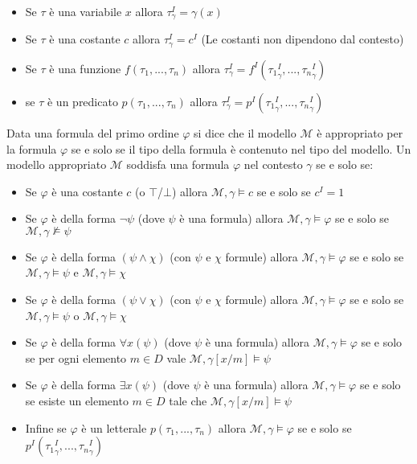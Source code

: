 \documentclass[./main.tex]{subfiles}
\begin{document}
\begin{itemize}
  \item Se $\tau$ è una variabile $x$ allora $\tau^I_\gamma = \gamma(x)$
  \item Se $\tau$ è una costante $c$ allora $\tau^I_\gamma = c^I$ (Le costanti non dipendono dal contesto)
  \item Se $\tau$ è una funzione $f(\tau_1, ..., \tau_n)$ allora $\tau^I_\gamma = f^I({\tau_1}^I_\gamma, ..., {\tau_n}^I_\gamma)$
  \item se $\tau$ è un predicato $p(\tau_1, ..., \tau_n)$ allora $\tau^I_\gamma = p^I({\tau_1}^I_\gamma, ..., {\tau_n}^I_\gamma)$
\end{itemize}


Data una formula del primo ordine $\varphi$ si dice che il modello $\mathcal{M}$ è appropriato per la formula $\varphi$ se e solo se il tipo della formula è contenuto nel tipo del modello.
Un modello appropriato $\mathcal{M}$ soddisfa una formula $\varphi$ nel contesto $\gamma$ se e solo se:
\begin{itemize}
  \item Se $\varphi$ è una costante $c$ (o $\top$/$\bot$) allora $\mathcal{M}, \gamma \models c$ se e solo se $c^I = 1$
  \item Se $\varphi$ è della forma $\lnot \psi$ (dove $\psi$ è una formula) allora $\mathcal{M}, \gamma \models \varphi$ se e solo se $\mathcal{M}, \gamma \not\models \psi$
  \item Se $\varphi$ è della forma $(\psi \land \chi)$ (con $\psi$ e $\chi$ formule) allora $\mathcal{M}, \gamma \models \varphi$ se e solo se $\mathcal{M}, \gamma \models \psi$ e $\mathcal{M}, \gamma \models \chi$
  \item Se $\varphi$ è della forma $(\psi \lor \chi)$ (con $\psi$ e $\chi$ formule) allora $\mathcal{M}, \gamma \models \varphi$ se e solo se $\mathcal{M}, \gamma \models \psi$ o $\mathcal{M}, \gamma \models \chi$
  \item Se $\varphi$ è della forma $\forall x (\psi)$ (dove $\psi$ è una formula) allora $\mathcal{M}, \gamma \models \varphi$
   se e solo se per ogni elemento $m \in D$ vale $\mathcal{M}, \gamma[x/m] \models \psi$
  \item Se $\varphi$ è della forma $\exists x (\psi)$ (dove $\psi$ è una formula) allora $\mathcal{M}, \gamma \models \varphi$ se e solo se
    esiste un elemento $m \in D$ tale che $\mathcal{M}, \gamma[x/m] \models \psi$
  \item Infine se $\varphi$ è un letterale $p(\tau_1, ..., \tau_n)$ allora $\mathcal{M}, \gamma \models \varphi$ se e solo se $p^I({\tau_1}^I_\gamma, ..., {\tau_n}^I_\gamma)$
\end{itemize}
\end{document}

